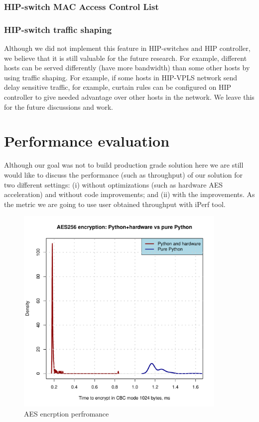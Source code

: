 \subsection{HIP-switch MAC Access Control List}
\subsection{HIP-switch traffic shaping}
Although we did not implement this feature in HIP-switches and HIP 
controller, we believe that it is still valuable for the future research.
For example, different hosts can be served differently (have more bandwidth)
than some other hosts by using traffic shaping. For example, if some hosts in HIP-VPLS 
network send delay sensitive traffic, for example, curtain rules can be configured 
on HIP controller to give needed advantage over other hosts in the network. We leave 
this for the future discussions and work.

\chapter{Performance evaluation}
Although our goal was not to build production grade solution
here we are still would like to discuss the performance 
(such as throughput) of our solution for two different settings:
(i) without optimizations (such as hardware AES acceleration) and 
without code improvements; and (ii) with the improvements. As the 
metric we are going to use user obtained throughput with iPerf tool. 

\begin{figure}[h!]
\centering
\includegraphics[width=0.9\textwidth]{graphics/AES.pdf}
\caption{AES encrption perfromance}
\label{fig:testbed}
\end{figure}
